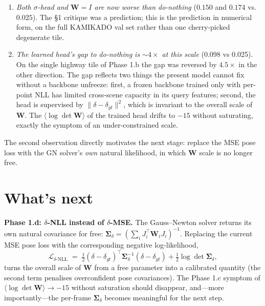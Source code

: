 \documentclass[10pt,conference,a4paper]{IEEEtran}
\newcommand{\W}{\mathbf{W}}
\newcommand{\Sig}{\boldsymbol{\Sigma}}
\begin{document}
\begin{enumerate}
\item \emph{Both $\sigma$-head and $\W{=}I$ are now worse than
do-nothing} ($0.150$ and $0.174$ vs.\ $0.025$). The §1 critique was a
prediction; this is the prediction in numerical form, on the full
KAMIKADO val set rather than one cherry-picked degenerate tile.
\item \emph{The learned head's gap to do-nothing is
$\sim$$4\times$ at this scale} (0.098 vs 0.025). On the single highway
tile of Phase 1.b the gap was reversed by $4.5\times$ in the other
direction. The gap reflects two things the present model cannot fix
without a backbone unfreeze: first, a frozen backbone trained only
with per-point NLL has limited cross-scene capacity in its query
features; second, the head is supervised by $\|\delta-\delta_{gt}\|^2$,
which is invariant to the overall scale of $\W$. The
$\langle\log\det\W\rangle$ of the trained head drifts to $-15$ without
saturating, exactly the symptom of an under-constrained scale.
\end{enumerate}

The second observation directly motivates the next stage: replace the
MSE pose loss with the GN solver's \emph{own} natural likelihood, in
which $\W$ scale is no longer free.

\section{What's next}\label{sec:next}

\textbf{Phase 1.d: $\delta$-NLL instead of $\delta$-MSE.}
The Gauss--Newton solver returns its own natural covariance for free:
$\Sig_\delta = (\sum_i J_i^\top \W_i J_i)^{-1}$.
Replacing the current MSE pose loss with the corresponding negative
log-likelihood,
%
\begin{equation}
\mathcal{L}_{\delta\text{-NLL}}
\;=\; \tfrac{1}{2}(\delta-\delta_{gt})^\top \Sig_\delta^{-1}
       (\delta-\delta_{gt}) + \tfrac{1}{2}\log\det\Sig_\delta,
\label{eq:dnll}
\end{equation}
%
turns the overall scale of $\W$ from a free parameter into a calibrated
quantity (the second term penalises overconfident pose covariances).
The Phase 1.c symptom of $\langle\log\det\W\rangle\to -15$ without
saturation should disappear, and---more importantly---the per-frame
$\Sig_\delta$ becomes meaningful for the next step.
\end{document}
